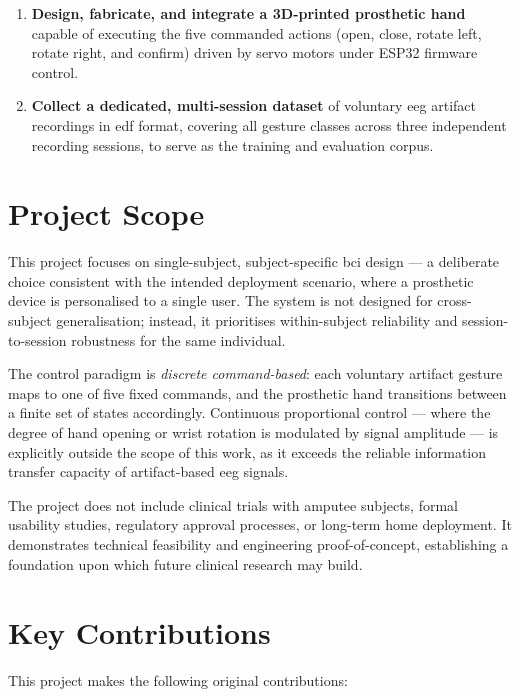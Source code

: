 \begin{enumerate}[leftmargin=*, label=\textbf{O\arabic*.}]
    \item \textbf{Design, fabricate, and integrate a 3D-printed
    prosthetic hand} capable of executing the five commanded actions
    (open, close, rotate left, rotate right, and confirm) driven by
    servo motors under ESP32 firmware control.

    \item \textbf{Collect a dedicated, multi-session dataset} of
    voluntary \acrshort{eeg} artifact recordings in \acrshort{edf}
    format, covering all gesture classes across three independent
    recording sessions, to serve as the training and evaluation
    corpus.

\end{enumerate}

\section{Project Scope}
\label{sec:scope}

This project focuses on single-subject, subject-specific
\acrshort{bci} design — a deliberate choice consistent with the
intended deployment scenario, where a prosthetic device is
personalised to a single user. The system is not designed for
cross-subject generalisation; instead, it prioritises within-subject
reliability and session-to-session robustness for the same individual.

The control paradigm is \textit{discrete command-based}: each
voluntary artifact gesture maps to one of five fixed commands, and
the prosthetic hand transitions between a finite set of states
accordingly. Continuous proportional control — where the degree of
hand opening or wrist rotation is modulated by signal amplitude —
is explicitly outside the scope of this work, as it exceeds the
reliable information transfer capacity of artifact-based
\acrshort{eeg} signals.

The project does not include clinical trials with amputee subjects,
formal usability studies, regulatory approval processes, or
long-term home deployment. It demonstrates technical feasibility
and engineering proof-of-concept, establishing a foundation upon
which future clinical research may build.

\section{Key Contributions}
\label{sec:contributions}

This project makes the following original contributions:

